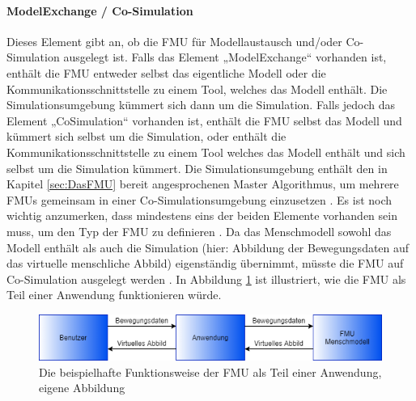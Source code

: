 \paragraph{ModelExchange / Co-Simulation}\label{sec:ModellExchangeCoSimulation}
\noindent Dieses Element gibt an, ob die FMU für Modellaustausch und/oder Co-Simulation ausgelegt ist.
Falls das Element „ModelExchange“ vorhanden ist, enthält die FMU entweder selbst das eigentliche Modell oder die Kommunikationsschnittstelle zu einem Tool, welches das Modell enthält. Die Simulationsumgebung kümmert sich dann um die Simulation.
Falls jedoch das Element „CoSimulation“ vorhanden ist, enthält die FMU selbst das Modell und kümmert sich selbst um die Simulation, oder enthält die Kommunikationsschnittstelle zu einem Tool welches das Modell enthält und sich selbst um die Simulation kümmert. Die Simulationsumgebung enthält den in Kapitel \ref*{sec:DasFMU} bereit angesprochenen Master Algorithmus, um mehrere FMUs gemeinsam in einer Co-Simulationsumgebung einzusetzen \cite[S.30]{25}.
Es ist noch wichtig anzumerken, dass mindestens eins der beiden Elemente vorhanden sein muss, um den Typ der FMU zu definieren \cite[S.31]{25}.
Da das Menschmodell sowohl das Modell enthält als auch die Simulation (hier: Abbildung der Bewegungsdaten auf das virtuelle menschliche Abbild) eigenständig übernimmt, müsste die FMU auf Co-Simulation ausgelegt werden \cite[S.30]{25}.
\newline
In Abbildung \ref{fig:FMUCoSimulation} ist illustriert, wie die FMU als Teil einer Anwendung funktionieren würde.
\begin{figure}[h]
	\centering
	\includegraphics[width=1\linewidth]{Bilder/A23_FMUCoSimulation}
	\caption{Die beispielhafte Funktionsweise der FMU als Teil einer Anwendung, eigene Abbildung}
	\label{fig:FMUCoSimulation}
\end{figure}

